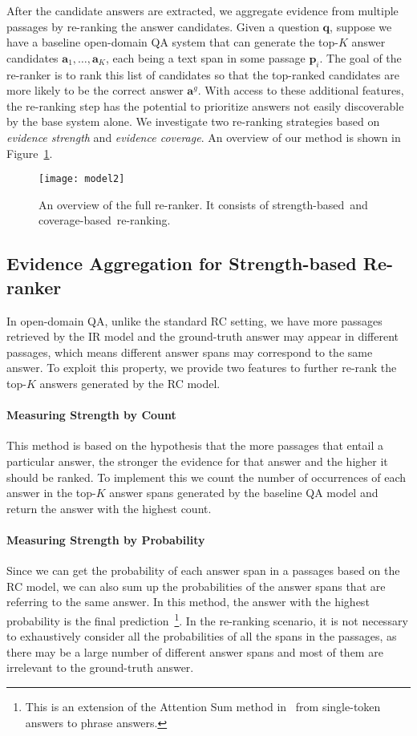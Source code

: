 \documentclass{article} \usepackage{iclr2018_conference,times}
\def \coherence {strength-based}
\def \union {coverage-based}
\begin{document}
After the candidate answers are extracted, we aggregate evidence from multiple passages by re-ranking the answer candidates. Given a question $\mathbf{q}$, suppose we have a baseline open-domain QA system that can generate the top-$K$ answer candidates $\mathbf{a}_1, \ldots, \mathbf{a}_K$, each being a text span in some passage $\mathbf{p}_i$. The goal of the re-ranker is to rank this list of candidates so that the top-ranked candidates are more likely to be the correct answer $\mathbf{a}^g$. With access to these additional features, the re-ranking step has the potential to prioritize answers not easily discoverable by the base system alone. We investigate two re-ranking strategies based on \textit{evidence strength} and \textit{evidence coverage}. An overview of our method is shown in Figure~\ref{fig:model}. 

\begin{figure}[t]
\centering
\texttt{[image: model2]}
\label{fig:model}
\vspace{-0.2in}
\caption{An overview of the full re-ranker. It consists of \coherence\ and \union\ re-ranking.}
\end{figure}

\subsection{Evidence Aggregation for Strength-based Re-ranker}
\label{sec:method_coherence}

In open-domain QA, unlike the standard RC setting, we have more passages retrieved by the IR model and the ground-truth answer may appear in different passages, which means different answer spans may correspond to the same answer. To exploit this property, we provide two features to further re-rank the top-$K$ answers generated by the RC model.

\paragraph{Measuring Strength by Count}
This method is based on the hypothesis that the more passages that entail a particular answer, the stronger the evidence for that answer and the higher it should be ranked.  To implement this we count the number of occurrences of each answer in the top-$K$ answer spans generated by the baseline QA model and return the answer with the highest count.

\paragraph{Measuring Strength by Probability} Since we can get the probability of each answer span in a passages based on the RC model, we can also sum up the probabilities of the answer spans that are referring to the same answer. In this method, the answer with the highest probability is the final prediction~\footnote{This is an extension of the Attention Sum method in~\citep{kadlec2016text} from single-token answers to phrase answers.}. In the re-ranking scenario, it is not necessary to exhaustively consider all the probabilities of all the spans in the passages, as there may be a large number of different answer spans and most of them are irrelevant to the ground-truth answer.
\end{document}
